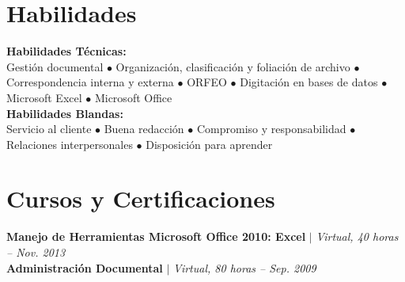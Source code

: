 \documentclass[letterpaper,11pt]{article}
\begin{document}
\section{Habilidades}
\begin{itemize}[leftmargin=0.15in, label={}]
  \small{\item{
    \textbf{Habilidades Técnicas:} \\
    Gestión documental $\bullet$ Organización, clasificación y foliación de archivo $\bullet$
    Correspondencia interna y externa $\bullet$ ORFEO $\bullet$ Digitación en bases de datos $\bullet$
    Microsoft Excel $\bullet$ Microsoft Office \\ \vspace{4pt}
    \textbf{Habilidades Blandas:} \\
    Servicio al cliente $\bullet$ Buena redacción $\bullet$ Compromiso y responsabilidad $\bullet$
    Relaciones interpersonales $\bullet$ Disposición para aprender
  }}
\end{itemize}

\section{Cursos y Certificaciones}
\begin{itemize}[leftmargin=0.15in, label={}]
  \small{\item{
    \textbf{Manejo de Herramientas Microsoft Office 2010: Excel} $|$ \textit{Virtual, 40 horas -- Nov. 2013} \\
    \textbf{Administración Documental} $|$ \textit{Virtual, 80 horas -- Sep. 2009}
  }}
\end{itemize}
\end{document}
